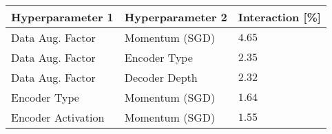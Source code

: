 \begin{tabular}{lll}
\toprule
Hyperparameter 1 & Hyperparameter 2 & Interaction [\%] \\
\midrule
Data Aug. Factor & Momentum (SGD) & $4.65$ \\
Data Aug. Factor & Encoder Type & $2.35$ \\
Data Aug. Factor & Decoder Depth & $2.32$ \\
Encoder Type & Momentum (SGD) & $1.64$ \\
Encoder Activation & Momentum (SGD) & $1.55$ \\
\bottomrule
\end{tabular}
